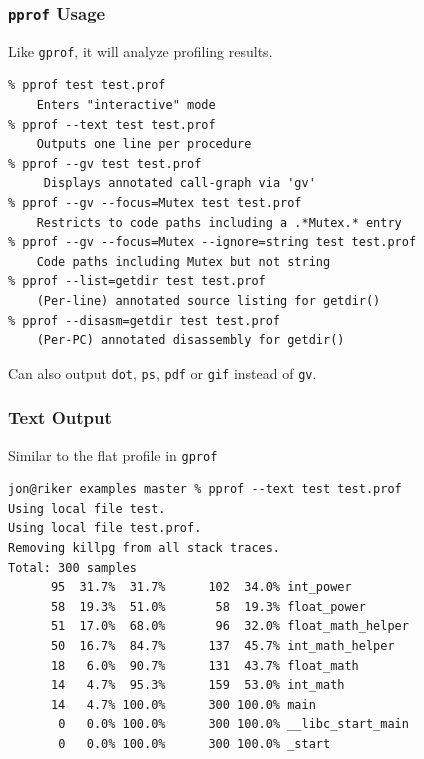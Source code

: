 \begin{frame}[fragile]
  \frametitle{{\tt pprof} Usage}


    Like {\tt gprof}, it will analyze profiling results.

  \begin{lstlisting}
% pprof test test.prof
    Enters "interactive" mode
% pprof --text test test.prof
    Outputs one line per procedure
% pprof --gv test test.prof
     Displays annotated call-graph via 'gv'
% pprof --gv --focus=Mutex test test.prof
    Restricts to code paths including a .*Mutex.* entry
% pprof --gv --focus=Mutex --ignore=string test test.prof
    Code paths including Mutex but not string
% pprof --list=getdir test test.prof
    (Per-line) annotated source listing for getdir()
% pprof --disasm=getdir test test.prof
    (Per-PC) annotated disassembly for getdir()
  \end{lstlisting}

    Can also output {\tt dot}, {\tt ps}, {\tt pdf} or {\tt gif} instead of
      {\tt gv}.
  

\end{frame}

\begin{frame}[fragile]
  \frametitle{Text Output}


    Similar to the flat profile in {\tt gprof}

  \begin{lstlisting}
jon@riker examples master % pprof --text test test.prof 
Using local file test.
Using local file test.prof.
Removing killpg from all stack traces.
Total: 300 samples
      95  31.7%  31.7%      102  34.0% int_power
      58  19.3%  51.0%       58  19.3% float_power
      51  17.0%  68.0%       96  32.0% float_math_helper
      50  16.7%  84.7%      137  45.7% int_math_helper
      18   6.0%  90.7%      131  43.7% float_math
      14   4.7%  95.3%      159  53.0% int_math
      14   4.7% 100.0%      300 100.0% main
       0   0.0% 100.0%      300 100.0% __libc_start_main
       0   0.0% 100.0%      300 100.0% _start
  \end{lstlisting}
  

\end{frame}

